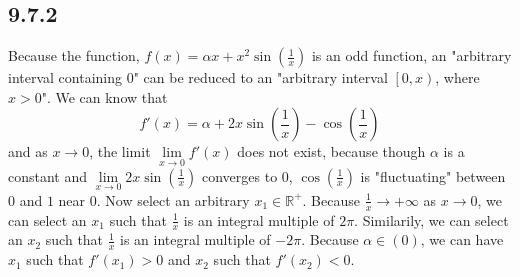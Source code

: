 \documentclass[11pt,twoside,a4paper]{article}
\begin{document}
\subsection{9.7.2}
Because the function, $f(x)=\alpha x+x^2\sin(\frac{1}{x})$ is an odd function, an "arbitrary interval containing 0" can be reduced to an "arbitrary interval $\left[0,x\right)$, where $x>0$".\newline
We can know that$$f'(x)=\alpha +2x\sin(\frac{1}{x})-\cos(\frac{1}{x})$$and as $x\rightarrow 0$, the limit $\lim\limits_{x\rightarrow 0}f'(x)$ does not exist, because though $\alpha$ is a constant and $\lim\limits_{x\rightarrow 0}2x\sin(\frac{1}{x})$ converges to $0$, $\cos(\frac{1}{x})$ is "fluctuating" between $0$ and $1$ near 0.\newline\newline
Now select an arbitrary $x_1\in\mathbb{R}^+$. Because $\frac{1}{x}\rightarrow +\infty$ as $x\rightarrow 0$, we can select an $x_1$ such that $\frac{1}{x}$ is an integral multiple of $2\pi$. Similarily, we can select an $x_2$ such that $\frac{1}{x}$ is an integral multiple of $-2\pi$.\newline\newline
Because $\alpha\in\left(0\right)$, we can have $x_1$ such that $f'(x_1 )>0$ and $x_2$ such that $f'(x_2 )<0$.
\end{document}
